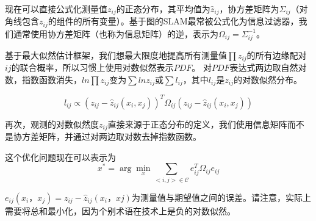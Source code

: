 现在可以直接公式化测量值$ z_{ij} $的正态分布，其平均值为$ \hat{z}_{ij} $，协方差矩阵为$ \Sigma_{ij} $（对角线包含$ z_{ij} $的组件的所有变量）。基于图的SLAM最常被公式化为信息过滤器，我们通常使用协方差矩阵（也称为信息矩阵）的逆，表示为$ \Omega_{ij} = \Sigma_{ij}^{-1} $。


基于最大似然估计框架，我们想最大限度地提高所有测量值$ \prod{z_{ij}} $的所有边缘配对$ ij $的联合概率，所以习惯上使用对数似然表示$PDF$。 对$PDF$表达式两边取自然对数，指数函数消失，$ln\prod{z_{ij}} $变为$ \sum{ln z_{ij}} $或$ \sum{l_{ij} } $，其中$ l_{ij} $是$ z_{ij} $的对数似然分布。

\begin{equation}
l_{ij} \propto (z_{ij}-\hat{z}_{ij}(x_i,x_j))^T\Omega_{ij}(z_{ij}-\hat{z}_{ij}(x_i,x_j))
\end{equation}


再次，观测的对数似然度$ z_{ij} $直接来源于正态分布的定义，我们使用信息矩阵而不是协方差矩阵，并通过对两边取对数去掉指数函数。

这个优化问题现在可以表示为
\begin{equation}
x^* = \arg \min_{x}\sum_{<i,j>\in \mathcal{C}}e_{ij}^T\Omega_{ij}e_{ij}
\end{equation}

$ e_{ij}(x_i，x_j)= z_ {ij} - \hat{z}_{ij}(x_i，xj)$为测量值与期望值之间的误差。请注意，实际上需要将总和最小化，因为个别术语在技术上是负的对数似然。

